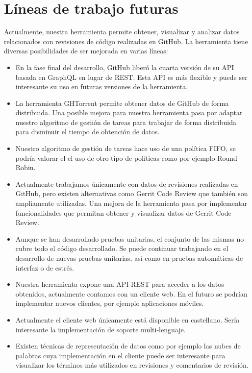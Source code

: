 \section{Líneas de trabajo futuras}

Actualmente, nuestra herramienta permite obtener, visualizar y analizar datos relacionados con revisiones de código realizadas en GitHub. La herramienta tiene diversas posibilidades de ser mejorada en varias líneas:

\begin{itemize}
	\item En la fase final del desarrollo, GitHub liberó la cuarta versión de su API basada en GraphQL \cite{github:api:v4} en lugar de REST. Esta API es más flexible y puede ser interesante su uso en futuras versiones de la herramienta.
	\item La herramienta GHTorrent permite obtener datos de GitHub de forma distribuida. Una posible mejora para nuestra herramienta pasa por adaptar nuestro algoritmo de gestión de tareas para trabajar de forma distribuida para disminuir el tiempo de obtención de datos.
	\item Nuestro algoritmo de gestión de tareas hace uso de una política FIFO, se podría valorar el el uso de otro tipo de políticas como por ejemplo Round Robin.
	\item Actualmente trabajamos únicamente con datos de revisiones realizadas en GitHub, pero existen alternativas como Gerrit Code Review que también son ampliamente utilizadas. Una mejora de la herramienta pasa por implementar funcionalidades que permitan obtener y visualizar datos de Gerrit Code Review.
	\item Aunque se han desarrollado pruebas unitarias, el conjunto de las mismas no cubre todo el código desarrollado. Se puede continuar trabajando en el desarrollo de nuevas pruebas unitarias, así como en pruebas automáticas de interfaz o de estrés.
	\item Nuestra herramienta expone una API REST para acceder a los datos obtenidos, actualmente contamos con un cliente web. En el futuro se podrían implementar nuevos clientes, por ejemplo aplicaciones móviles.
	\item Actualmente el cliente web únicamente está disponible en castellano. Sería interesante la implementación de soporte multi-lenguaje.
	\item Existen técnicas de representación de datos como por ejemplo las nubes de palabras cuya implementación en el cliente puede ser interesante para visualizar los términos más utilizados en revisiones y comentarios de revisión.
\end{itemize}
